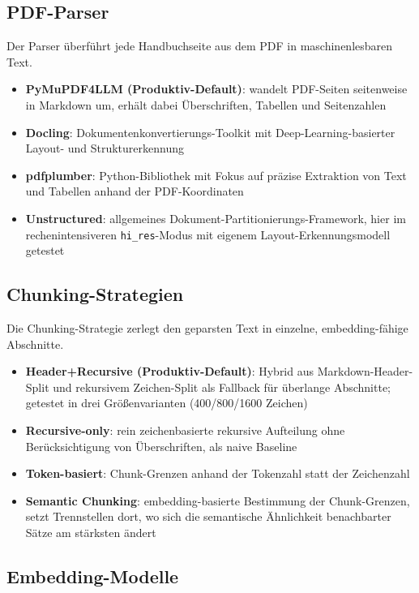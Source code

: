 \documentclass[11pt,a4paper]{article}
\begin{document}
\subsection{PDF-Parser}

Der Parser überführt jede Handbuchseite aus dem PDF in maschinenlesbaren Text.

\begin{itemize}
    \item \textbf{PyMuPDF4LLM (Produktiv-Default)}: wandelt PDF-Seiten seitenweise in Markdown um, erhält dabei Überschriften, Tabellen und Seitenzahlen
    \item \textbf{Docling}: Dokumentenkonvertierungs-Toolkit mit Deep-Learning-basierter Layout- und Strukturerkennung
    \item \textbf{pdfplumber}: Python-Bibliothek mit Fokus auf präzise Extraktion von Text und Tabellen anhand der PDF-Koordinaten
    \item \textbf{Unstructured}: allgemeines Dokument-Partitionierungs-Framework, hier im rechenintensiveren \texttt{hi\_res}-Modus mit eigenem Layout-Erkennungsmodell getestet
\end{itemize}

\subsection{Chunking-Strategien}

Die Chunking-Strategie zerlegt den geparsten Text in einzelne, embedding-fähige Abschnitte.

\begin{itemize}
    \item \textbf{Header+Recursive (Produktiv-Default)}: Hybrid aus Markdown-Header-Split und rekursivem Zeichen-Split als Fallback für überlange Abschnitte; getestet in drei Größenvarianten (400/800/1600 Zeichen)
    \item \textbf{Recursive-only}: rein zeichenbasierte rekursive Aufteilung ohne Berücksichtigung von Überschriften, als naive Baseline
    \item \textbf{Token-basiert}: Chunk-Grenzen anhand der Tokenzahl statt der Zeichenzahl
    \item \textbf{Semantic Chunking}: embedding-basierte Bestimmung der Chunk-Grenzen, setzt Trennstellen dort, wo sich die semantische Ähnlichkeit benachbarter Sätze am stärksten ändert
\end{itemize}

\subsection{Embedding-Modelle}
\end{document}
